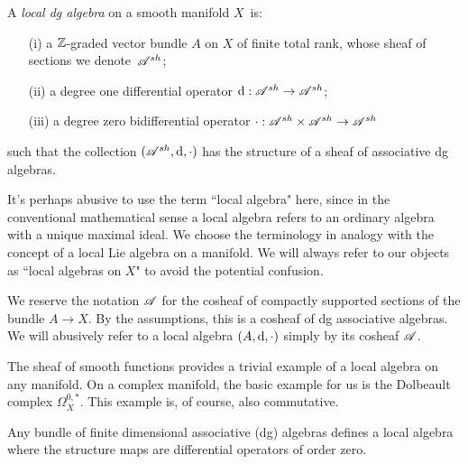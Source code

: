 \begin{dfn}\label{def: localalg}
A {\em local dg algebra} on a smooth manifold $X$~is:
\begin{enumerate}
\item[(i)] a $\mathbb Z$-graded vector bundle $A$ on $X$ of finite total rank, whose sheaf of sections we denote~$\mathscr A^{sh}$;
\item[(ii)] a degree one differential operator ${\rm d} : \mathscr A^{sh} \to \mathscr A^{sh}$;
\item[(iii)] a degree zero bidifferential operator $\cdot : \mathscr A^{sh} \times \mathscr A^{sh} \to \mathscr A^{sh}$
\end{enumerate}
such that the collection $(\mathscr A^{sh}, {\rm d}, \cdot)$ has the structure of a sheaf of associative dg algebras.
\end{dfn}

\begin{rmk}
It's perhaps abusive to use the term ``local algebra" here, since in the conventional mathematical sense a local algebra refers to an ordinary algebra with a unique maximal ideal. 
We choose the terminology in analogy with the concept of a local Lie algebra on a manifold. 
We will always refer to our objects as ``local algebras on $X$" to avoid the potential confusion. 
\end{rmk}


We reserve the notation $\mathscr A$ for the cosheaf of compactly supported sections of the bundle $A \to X$.
By the assumptions, this is a cosheaf of dg associative algebras. 
We will abusively refer to a local algebra $(A, {\rm d}, \cdot)$ simply by its cosheaf $\mathscr A$.

\begin{eg}
The sheaf of smooth functions provides a trivial example of a local algebra on any manifold. 
On a complex manifold, the basic example for us is the Dolbeault complex $\Omega^{0,*}_X$.
This example is, of course, also commutative. 
\end{eg}

Any bundle of finite dimensional associative (dg) algebras defines a local algebra where the structure maps are differential operators of order zero. 


